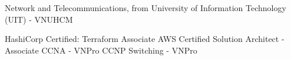 %
%
%


\begin{scholarship}
					{Network and Telecommunications, from University of Information Technology (UIT) - VNUHCM}
\end{scholarship}

\begin{scholarship}
					{HashiCorp Certified: Terraform Associate}
					{AWS Certified Solution Architect - Associate}
					{CCNA - VNPro}
					{CCNP Switching - VNPro}
\end{scholarship}